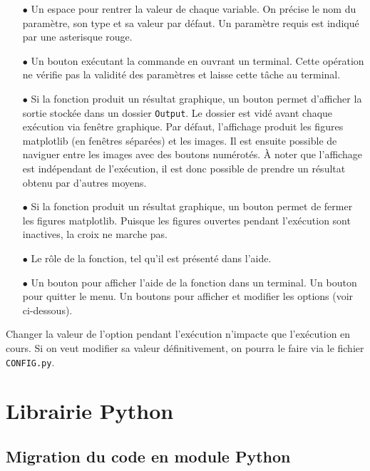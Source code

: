 \documentclass[12pt]{article}
\begin{document}
    \begin{enumerate}
        \item[$\bullet$] Un espace pour rentrer la valeur de chaque variable. On précise le nom du paramètre, son type et sa valeur par défaut. Un paramètre requis est indiqué par une asterisque rouge.

        \item[$\bullet$] Un bouton exécutant la commande en ouvrant un terminal. Cette opération ne vérifie pas la validité des paramètres et laisse cette tâche au terminal.

        \item[$\bullet$] Si la fonction produit un résultat graphique, un bouton permet d'afficher la sortie stockée dans un dossier \texttt{Output}. Le dossier est vidé avant chaque exécution via fenêtre graphique. Par défaut, l'affichage produit les figures matplotlib (en fenêtres séparées) et les images. Il est ensuite possible de naviguer entre les images avec des boutons numérotés. À noter que l'affichage est indépendant de l'exécution, il est donc possible de prendre un résultat obtenu par d'autres moyens.

        \item[$\bullet$] Si la fonction produit un résultat graphique, un bouton permet de fermer les figures matplotlib. Puisque les figures ouvertes pendant l'exécution sont inactives, la croix ne marche pas.

        \item[$\bullet$] Le rôle de la fonction, tel qu'il est présenté dans l'aide.

        \item[$\bullet$] Un bouton pour afficher l'aide de la fonction dans un terminal. Un bouton pour quitter le menu. Un boutons pour afficher et modifier les options (voir ci-dessous).
    \end{enumerate}

    Changer la valeur de l'option pendant l'exécution n'impacte que l'exécution en cours. Si on veut modifier sa valeur définitivement, on pourra le faire via le fichier \texttt{CONFIG.py}.

\section{Librairie Python}
\subsection{Migration du code en module Python}
\end{document}
